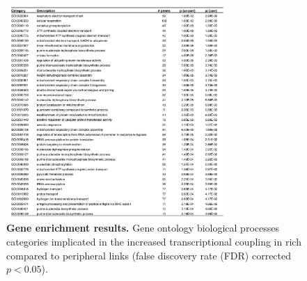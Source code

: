 \begin{figure}[h!]
\begin{center}
\includegraphics[width=0.75\textwidth]{Chapter5/SFigure14.pdf}%
\end{center}
\caption{\textbf{Gene enrichment results.}
Gene ontology biological processes categories implicated in the increased transcriptional coupling in rich compared to peripheral links (false discovery rate (FDR) corrected $p<0.05$). }
\label{fig:Ch5SFig14}
\end{figure}
